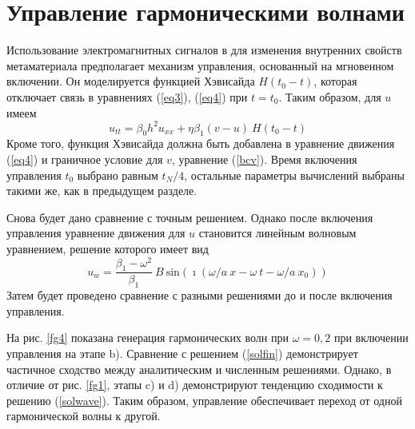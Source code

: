 \section{Управление гармоническими волнами} 

Использование электромагнитных сигналов в \cite {Yang, Chen2014, Xiao2015} для изменения внутренних свойств метаматериала предполагает механизм управления, основанный на мгновенном включении. Он моделируется функцией Хэвисайда $ H (t_0-t) $, которая отключает связь в уравнениях (\ref{eq3}), (\ref{eq4}) при $ t = t_0 $. Таким образом, для $ u $ имеем
\[
u_{tt}=\beta_0 h^2 u_{xx}+\eta \beta_1 (v-u)~H(t_0-t)
\]
Кроме того, функция Хэвисайда должна быть добавлена в уравнение движения (\ref {eq4}) и граничное условие для $ v $, уравнение (\ref{bcv}). Время включения управления $ t_0 $ выбрано равным $ t_N / 4 $, остальные параметры вычислений выбраны такими же, как в предыдущем разделе.

Снова будет дано сравнение с точным решением. Однако после включения управления уравнение движения для $ u $ становится линейным волновым уравнением, решение которого имеет вид
\begin{equation}\label{solwave}
u_w=\frac{\beta_1-\omega^2}{\beta_1}~B~{\text{sin}}  (\imath(\omega/a~ x - \omega~ t-\omega/a~ x_0))
\end{equation}
Затем будет проведено сравнение с разными решениями до и после включения управления. 
 
На рис. \ref{fg4} показана генерация гармонических волн при $ \omega = 0,2 $ при включении управления на этапе b). Сравнение с решением (\ref{solfin}) демонстрирует частичное сходство между аналитическим и численным решениями. Однако, в отличие от рис. \ref{fg1}, этапы c) и d) демонстрируют тенденцию сходимости к решению (\ref{solwave}). Таким образом, управление обеспечивает переход от одной гармонической волны к другой.

